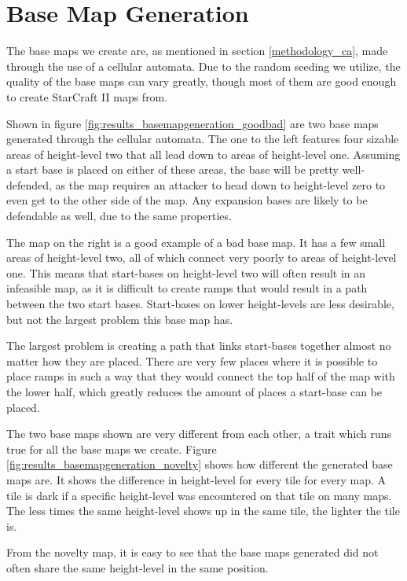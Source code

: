 \section{Base Map Generation}
\label{results_basemapgeneration}

The base maps we create are, as mentioned in section \ref{methodology_ca}, made through the use of a cellular automata. Due to the random seeding we utilize, the quality of the base maps can vary greatly, though most of them are good enough to create StarCraft II maps from.

Shown in figure \ref{fig:results_basemapgeneration_goodbad} are two base maps generated through the cellular automata. The one to the left features four sizable areas of height-level two that all lead down to areas of height-level one. Assuming a start base is placed on either of these areas, the base will be pretty well-defended, as the map requires an attacker to head down to height-level zero to even get to the other side of the map. Any expansion bases are likely to be defendable as well, due to the same properties.

The map on the right is a good example of a bad base map. It has a few small areas of height-level two, all of which connect very poorly to areas of height-level one. This means that start-bases on height-level two will often result in an infeasible map, as it is difficult to create ramps that would result in a path between the two start bases. Start-bases on lower height-levels are less desirable, but not the largest problem this base map has. 

The largest problem is creating a path that links start-bases together almost no matter how they are placed. There are very few places where it is possible to place ramps in such a way that they would connect the top half of the map with the lower half, which greatly reduces the amount of places a start-base can be placed.


The two base maps shown are very different from each other, a trait which runs true for all the base maps we create. Figure \ref{fig:results_basemapgeneration_novelty} shows how different the generated base maps are. It shows the difference in height-level for every tile for every map. A tile is dark if a specific height-level was encountered on that tile on many maps. The less times the same height-level shows up in the same tile, the lighter the tile is.


From the novelty map, it is easy to see that the base maps generated did not often share the same height-level in the same position.



